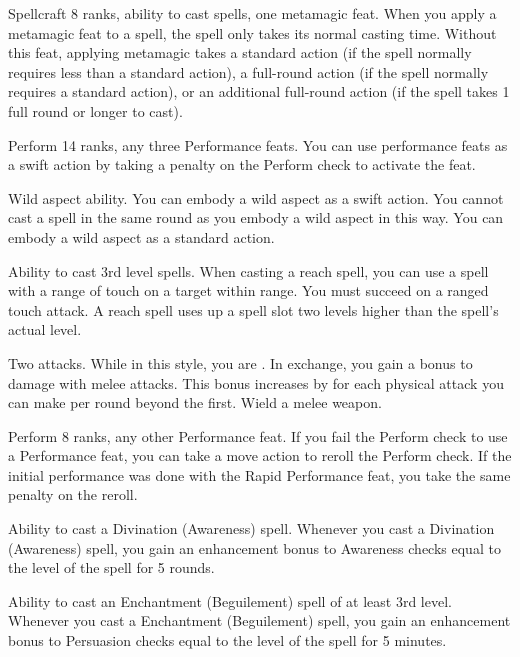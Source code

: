 \featpres
Spellcraft 8 ranks, ability to cast spells, one metamagic feat.
\featben When you apply a metamagic feat to a spell, the spell only takes its normal casting time.
Without this feat, applying metamagic takes a standard action (if the spell normally requires less than a standard action), a full-round action (if the spell normally requires a standard action), or an additional full-round action (if the spell takes 1 full round or longer to cast).

\featpres Perform 14 ranks, any three Performance feats.
\featben You can use performance feats as a swift action by taking a  penalty on the Perform check to activate the feat.

\featpre Wild aspect ability.
\featben You can embody a wild aspect as a swift action.
You cannot cast a spell in the same round as you embody a wild aspect in this way.
You can embody a wild aspect as a standard action.

\featpre Ability to cast 3rd level spells.
\featben When casting a reach spell, you can use a spell with a range of touch on a target within \rngclose range.
You must succeed on a ranged touch attack.
A reach spell uses up a spell slot two levels higher than the spell's actual level.

\featpre Two attacks.
\featben While in this style, you are .
In exchange, you gain a  bonus to damage with melee attacks.
This bonus increases by  for each physical attack you can make per round beyond the first.
\stylereq Wield a melee weapon.

\featpres Perform 8 ranks, any other Performance feat.
\featben If you fail the Perform check to use a Performance feat, you can take a move action to reroll the Perform check.
If the initial performance was done with the Rapid Performance feat, you take the same  penalty on the reroll.

\featpre Ability to cast a Divination (Awareness) spell.
\featben Whenever you cast a Divination (Awareness) spell, you gain an enhancement bonus to Awareness checks equal to the level of the spell for 5 rounds.

\featpre Ability to cast an Enchantment (Beguilement) spell of at least 3rd level.
\featben Whenever you cast a Enchantment (Beguilement) spell, you gain an enhancement bonus to Persuasion checks equal to the level of the spell for 5 minutes.

